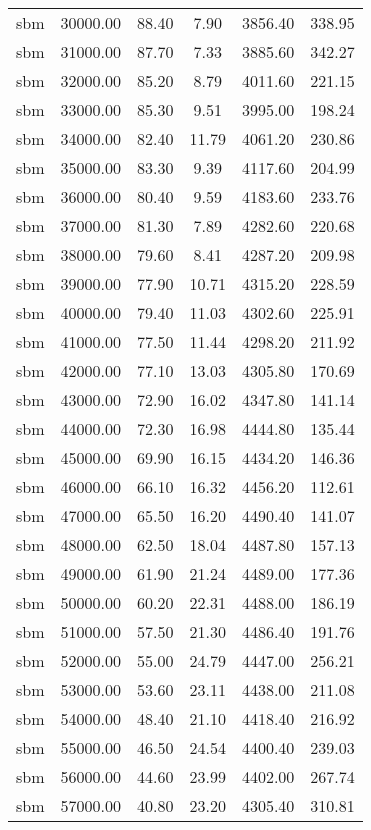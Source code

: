 \begin{table}[ht]
\begin{table}[ht]
\begin{tabular}{|cccccc}
  sbm & 30000.00 & 88.40 & 7.90 & 3856.40 & 338.95 \\ 
  sbm & 31000.00 & 87.70 & 7.33 & 3885.60 & 342.27 \\ 
  sbm & 32000.00 & 85.20 & 8.79 & 4011.60 & 221.15 \\ 
  sbm & 33000.00 & 85.30 & 9.51 & 3995.00 & 198.24 \\ 
  sbm & 34000.00 & 82.40 & 11.79 & 4061.20 & 230.86 \\ 
  sbm & 35000.00 & 83.30 & 9.39 & 4117.60 & 204.99 \\ 
  sbm & 36000.00 & 80.40 & 9.59 & 4183.60 & 233.76 \\ 
  sbm & 37000.00 & 81.30 & 7.89 & 4282.60 & 220.68 \\ 
  sbm & 38000.00 & 79.60 & 8.41 & 4287.20 & 209.98 \\ 
  sbm & 39000.00 & 77.90 & 10.71 & 4315.20 & 228.59 \\ 
  sbm & 40000.00 & 79.40 & 11.03 & 4302.60 & 225.91 \\ 
  sbm & 41000.00 & 77.50 & 11.44 & 4298.20 & 211.92 \\ 
  sbm & 42000.00 & 77.10 & 13.03 & 4305.80 & 170.69 \\ 
  sbm & 43000.00 & 72.90 & 16.02 & 4347.80 & 141.14 \\ 
  sbm & 44000.00 & 72.30 & 16.98 & 4444.80 & 135.44 \\ 
  sbm & 45000.00 & 69.90 & 16.15 & 4434.20 & 146.36 \\ 
  sbm & 46000.00 & 66.10 & 16.32 & 4456.20 & 112.61 \\ 
  sbm & 47000.00 & 65.50 & 16.20 & 4490.40 & 141.07 \\ 
  sbm & 48000.00 & 62.50 & 18.04 & 4487.80 & 157.13 \\ 
  sbm & 49000.00 & 61.90 & 21.24 & 4489.00 & 177.36 \\ 
  sbm & 50000.00 & 60.20 & 22.31 & 4488.00 & 186.19 \\ 
  sbm & 51000.00 & 57.50 & 21.30 & 4486.40 & 191.76 \\ 
  sbm & 52000.00 & 55.00 & 24.79 & 4447.00 & 256.21 \\ 
  sbm & 53000.00 & 53.60 & 23.11 & 4438.00 & 211.08 \\ 
  sbm & 54000.00 & 48.40 & 21.10 & 4418.40 & 216.92 \\ 
  sbm & 55000.00 & 46.50 & 24.54 & 4400.40 & 239.03 \\ 
  sbm & 56000.00 & 44.60 & 23.99 & 4402.00 & 267.74 \\ 
  sbm & 57000.00 & 40.80 & 23.20 & 4305.40 & 310.81 \\ 

\end{tabular}
\end{table}
\end{table}
